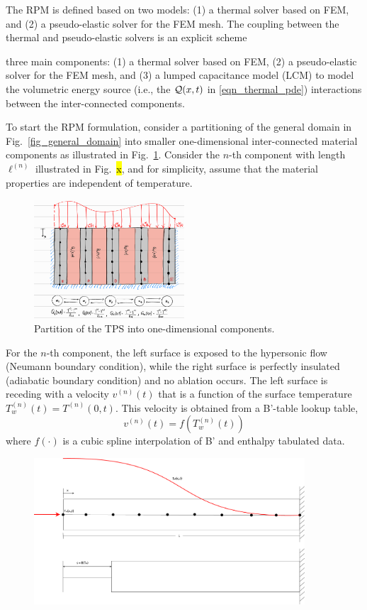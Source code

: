 The RPM is defined based on two models: (1) a thermal solver based on FEM, and (2) a pseudo-elastic solver for the FEM mesh. The coupling between the thermal and pseudo-elastic solvers is an explicit scheme 


three main components: (1) a thermal solver based on FEM, (2) a pseudo-elastic solver for the FEM mesh, and (3) a lumped capacitance model (LCM) to model the volumetric energy source (i.e., the $\mathcal{Q}(x,t)$ in \cref{eqn_thermal_pde}) interactions between the inter-connected components.

To start the RPM formulation, consider a partitioning of the general domain in Fig.~\ref{fig_general_domain} into smaller one-dimensional inter-connected material components as illustrated in Fig.~\ref{fig_domain_partition}. Consider the $n$-th component with length $\ell^{(n)}$ illustrated in Fig.~\hl{x}, and for simplicity, assume that the material properties are independent of temperature.

\begin{figure}
    \centering
    \includegraphics[width=0.5\textwidth]{./figs/domain_partition.png}
    \caption{Partition of the TPS into one-dimensional components.}
    \label{fig_domain_partition}
\end{figure}

For the $n$-th component, the left surface is exposed to the hypersonic flow (Neumann boundary condition), while the right surface is perfectly insulated (adiabatic boundary condition) and no ablation occurs. The left surface is receding with a velocity $v^{(n)}(t)$ that is a function of the surface temperature $T^{(n)}_w(t)=T^{(n)}(0,t)$. This velocity is obtained from a B'-table lookup table,
\[
    v^{(n)}(t) = f(T^{(n)}_w(t))
\]
where $f(\cdot)$ is a cubic spline interpolation of B' and enthalpy tabulated data.

\begin{figure}[h]
    \centering
    \includegraphics[width=0.9\textwidth]{./figs/ablation.png}
    \label{fig_ablation_domain}
\end{figure}

